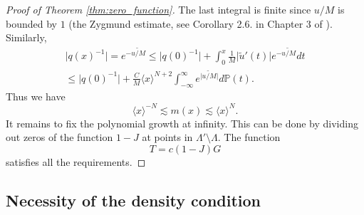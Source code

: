 \documentclass{article}[12pt]
\theoremstyle{remark}
\begin{document}
\begin{proof}[Proof of Theorem \ref{thm:zero_function}]
            The last integral is finite since $u/M$ is bounded by $1$ (the Zygmund estimate, see Corollary 2.6. in Chapter 3 of \cite{MR2261424}). Similarly,
            \begin{equation*}
                \begin{split}
                    \lvert q(x)^{-1} \rvert = e^{-\widetilde{u/M}} \leq \lvert q(0)^{-1} \rvert + \int_{0}^{x} \frac{1}{M} \lvert \widetilde{u}'(t) \rvert e^{-\widetilde{u/M}}dt \\ \leq \lvert q(0)^{-1} \rvert + \frac{C}{M}\langle x \rangle^{N+2}\int_{-\infty}^{\infty}e^{\lvert \widetilde{u/M} \rvert}d\mathbb{P}(t).         
                \end{split}
            \end{equation*}
            Thus we have
            \begin{equation*}
                \langle x \rangle^{-N} \lesssim m(x) \lesssim \langle x \rangle^{N}.
            \end{equation*}
            It remains to fix the polynomial growth at infinity. This can be done by dividing out zeros of the function $1-J$ at points in $\Lambda' \setminus \Lambda$. The function
            \begin{equation*}
                T = c(1-J)G
            \end{equation*}
            satisfies all the requirements.
        \end{proof}

    \subsection{Necessity of the density condition}
\end{document}
